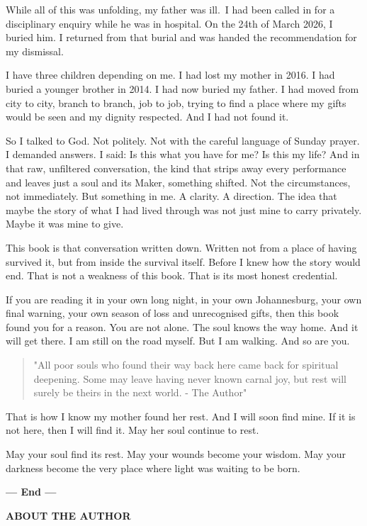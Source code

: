 While all of this was unfolding, my father was ill.~I had been called in
for a disciplinary enquiry while he was in hospital. On the 24th of
March 2026, I buried him. I returned from that burial and was handed the
recommendation for my dismissal.

I have three children depending on me. I had lost my mother in 2016. I
had buried a younger brother in 2014. I had now buried my father. I had
moved from city to city, branch to branch, job to job, trying to find a
place where my gifts would be seen and my dignity respected. And I had
not found it.

So I talked to God. Not politely. Not with the careful language of
Sunday prayer. I demanded answers. I said: Is this what you have for me?
Is this my life? And in that raw, unfiltered conversation, the kind that
strips away every performance and leaves just a soul and its Maker,
something shifted. Not the circumstances, not immediately. But something
in me. A clarity. A direction. The idea that maybe the story of what I
had lived through was not just mine to carry privately. Maybe it was
mine to give.

This book is that conversation written down. Written not from a place of
having survived it, but from inside the survival itself. Before I knew
how the story would end. That is not a weakness of this book. That is
its most honest credential.

If you are reading it in your own long night, in your own Johannesburg,
your own final warning, your own season of loss and unrecognised gifts,
then this book found you for a reason. You are not alone. The soul knows
the way home. And it will get there. I am still on the road myself. But
I am walking. And so are you.

\begin{quote}
"All poor souls who found their way back here came back for spiritual
deepening. Some may leave having never known carnal joy, but rest will
surely be theirs in the next world. - The Author"
\end{quote}

That is how I know my mother found her rest. And I will soon find mine.
If it is not here, then I will find it. May her soul continue to rest.

May your soul find its rest. May your wounds become your wisdom. May
your darkness become the very place where light was waiting to be born.

\textbf{--- End ---}

\textbf{ABOUT THE AUTHOR}

